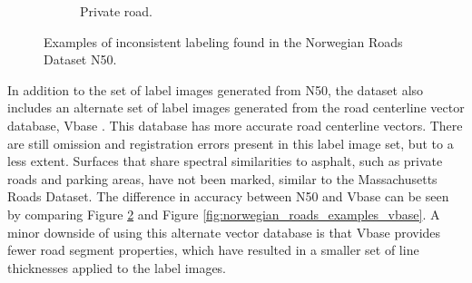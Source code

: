 \begin{figure}[h]
\begin{subfigure}{0.31\textwidth}
\caption{Private road.} \label{fig:norwegian_roads_missing_n50}
\end{subfigure}
\hspace*{\fill} %
\caption[Inconsistent labeling in the Norwegian Roads Dataset N50]{Examples of inconsistent labeling found in the Norwegian Roads Dataset N50.} \label{fig:norwegian_roads_examples_n50}
\end{figure}

In addition to the set of label images generated from N50, the dataset also includes an alternate set of label images generated from the road centerline vector database, Vbase \citep{Kartverket_vbase}. This database has more accurate road centerline vectors. There are still omission and registration errors present in this label image set, but to a less extent. Surfaces that share spectral similarities to asphalt, such as private roads and parking areas, have not been marked, similar to the Massachusetts Roads Dataset. The difference in accuracy between N50 and Vbase can be seen by comparing Figure \ref{fig:norwegian_roads_examples_n50} and Figure \ref{fig:norwegian_roads_examples_vbase}. A minor downside of using this alternate vector database is that Vbase provides fewer road segment properties, which have resulted in a smaller set of line thicknesses applied to the label images.\\

